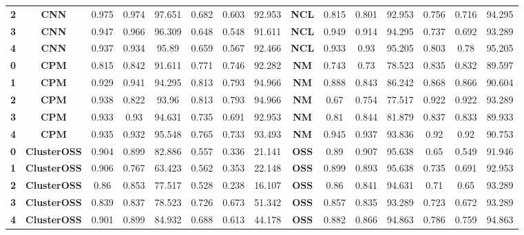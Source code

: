 {{\begin{tabular}{c|c|cccccc|ccccccc}
\textbf{2} & \textbf{CNN} & 0.975 & 0.974 & 97.651 & 0.682 & 0.603 & 92.953 & \multicolumn{1}{c|}{\textbf{NCL}} & 0.815 & 0.801 & 92.953 & 0.756 & 0.716 & 94.295 \\
\textbf{3} & \textbf{CNN} & 0.947 & 0.966 & 96.309 & 0.648 & 0.548 & 91.611 & \multicolumn{1}{c|}{\textbf{NCL}} & 0.949 & 0.914 & 94.295 & 0.737 & 0.692 & 93.289 \\
\textbf{4} & \textbf{CNN} & 0.937 & 0.934 & 95.89 & 0.659 & 0.567 & 92.466 & \multicolumn{1}{c|}{\textbf{NCL}} & 0.933 & 0.93  & 95.205 & 0.803 & 0.78  & 95.205 \\
\textbf{0} & \textbf{CPM} & 0.815 & 0.842 & 91.611 & 0.771 & 0.746 & 92.282 & \multicolumn{1}{c|}{\textbf{NM}} & 0.743 & 0.73  & 78.523 & 0.835 & 0.832 & 89.597 \\
\textbf{1} & \textbf{CPM} & 0.929 & 0.941 & 94.295 & 0.813 & 0.793 & 94.966 & \multicolumn{1}{c|}{\textbf{NM}} & 0.888 & 0.843 & 86.242 & 0.868 & 0.866 & 90.604 \\
\textbf{2} & \textbf{CPM} & 0.938 & 0.822 & 93.96 & 0.813 & 0.793 & 94.966 & \multicolumn{1}{c|}{\textbf{NM}} & 0.67  & 0.754 & 77.517 & 0.922 & 0.922 & 93.289 \\
\textbf{3} & \textbf{CPM} & 0.933 & 0.93  & 94.631 & 0.735 & 0.691 & 92.953 & \multicolumn{1}{c|}{\textbf{NM}} & 0.81  & 0.844 & 81.879 & 0.837 & 0.833 & 89.933 \\
\textbf{4} & \textbf{CPM} & 0.935 & 0.932 & 95.548 & 0.765 & 0.733 & 93.493 & \multicolumn{1}{c|}{\textbf{NM}} & 0.945 & 0.937 & 93.836 & 0.92  & 0.92  & 90.753 \\
\textbf{0} & \textbf{ClusterOSS} & 0.904 & 0.899 & 82.886 & 0.557 & 0.336 & 21.141 & \multicolumn{1}{c|}{\textbf{OSS}} & 0.89  & 0.907 & 95.638 & 0.65  & 0.549 & 91.946 \\
\textbf{1} & \textbf{ClusterOSS} & 0.906 & 0.767 & 63.423 & 0.562 & 0.353 & 22.148 & \multicolumn{1}{c|}{\textbf{OSS}} & 0.899 & 0.893 & 95.638 & 0.735 & 0.691 & 92.953 \\
\textbf{2} & \textbf{ClusterOSS} & 0.86  & 0.853 & 77.517 & 0.528 & 0.238 & 16.107 & \multicolumn{1}{c|}{\textbf{OSS}} & 0.86  & 0.841 & 94.631 & 0.71  & 0.65  & 93.289 \\
\textbf{3} & \textbf{ClusterOSS} & 0.839 & 0.837 & 78.523 & 0.726 & 0.673 & 51.342 & \multicolumn{1}{c|}{\textbf{OSS}} & 0.857 & 0.835 & 93.289 & 0.723 & 0.672 & 93.289 \\
\textbf{4} & \textbf{ClusterOSS} & 0.901 & 0.899 & 84.932 & 0.688 & 0.613 & 44.178 & \multicolumn{1}{c|}{\textbf{OSS}} & 0.882 & 0.866 & 94.863 & 0.786 & 0.759 & 94.863 \\

\end{tabular}}}
